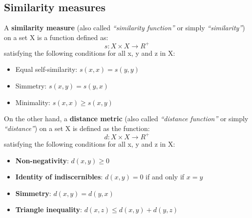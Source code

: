 \subsection*{Similarity measures}
A \textbf{similarity measure} (also called \textit{``similarity function''} or simply \textit{``similarity''}) on a set X is a function defined as:
\begin{equation}
s : X \times X \rightarrow R^+
\end{equation}
satisfying the following conditions for all x, y and z in X:
\begin{itemize}
\item Equal self-similarity: $s(x,x) = s(y,y)$
\item Simmetry: $s(x,y) = s(y,x)$
\item Minimality: $s(x,x) \geq s(x,y)$
\end{itemize}

On the other hand, a \textbf{distance metric} (also called \textit{``distance function''} or simply \textit{``distance''}) on a set X is defined as the function:
\begin{equation}
d : X \times X \rightarrow R^+
\end{equation}
satisfying the following conditions for all x, y and z in X:
\begin{itemize}
\item \textbf{Non-negativity}: $d(x,y) \geq 0$
\item \textbf{Identity of indiscernibles}: $d(x,y) = 0$ if and only if $x=y$
\item \textbf{Simmetry}: $d(x,y) = d(y,x)$
\item \textbf{Triangle inequality}: $d(x,z) \leq d(x,y) + d(y,z)$
\end{itemize}


